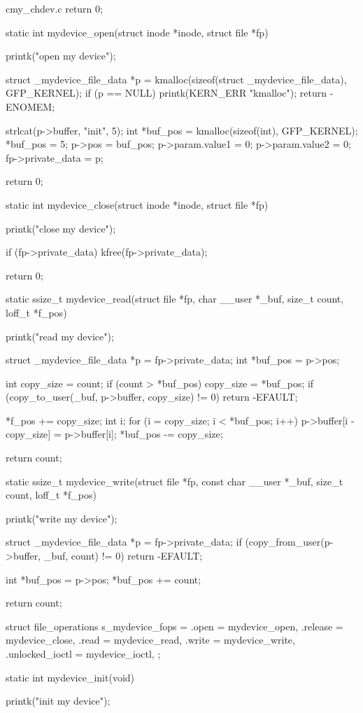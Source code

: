 \begin{longlisting}
\begin{myminted}{c}{my\_chdev.c}
{    return 0;
}

static int mydevice_open(struct inode *inode, struct file *fp) {
    printk("open my device\n");

    struct _mydevice_file_data *p = kmalloc(sizeof(struct _mydevice_file_data), GFP_KERNEL);
    if (p == NULL) {
        printk(KERN_ERR  "kmalloc\n");
        return -ENOMEM;
    }

    strlcat(p->buffer, "init", 5);
    int *buf_pos = kmalloc(sizeof(int), GFP_KERNEL);
    *buf_pos = 5;
    p->pos = buf_pos;
    p->param.value1 = 0;
    p->param.value2 = 0;
    fp->private_data = p;

    return 0;
}

static int mydevice_close(struct inode *inode, struct file *fp) {
    printk("close my device\n");

    if (fp->private_data) {
        kfree(fp->private_data);
    }

    return 0;
}

static ssize_t mydevice_read(struct file *fp, char __user *_buf, size_t count, loff_t *f_pos) {
    printk("read my device\n");

    struct _mydevice_file_data *p = fp->private_data;
    int *buf_pos = p->pos;

    int copy_size = count;
    if (count > *buf_pos) copy_size = *buf_pos;
    if (copy_to_user(_buf, p->buffer, copy_size) != 0) {
        return -EFAULT;
    }

    *f_pos += copy_size;
    int i;
    for (i = copy_size; i < *buf_pos; i++) {
        p->buffer[i - copy_size] = p->buffer[i];
    }
    *buf_pos -= copy_size;

    return count;
}

static ssize_t mydevice_write(struct file *fp, const char __user *_buf, size_t count, loff_t *f_pos) {
    printk("write my device\n");

    struct _mydevice_file_data *p = fp->private_data;
    if (copy_from_user(p->buffer, _buf, count) != 0) {
        return -EFAULT;
    }

    int *buf_pos = p->pos;
    *buf_pos += count;

    return count;
}

struct file_operations s_mydevice_fops = {
    .open    = mydevice_open,
    .release = mydevice_close,
    .read    = mydevice_read,
    .write   = mydevice_write,
    .unlocked_ioctl = mydevice_ioctl,
};

static int mydevice_init(void) {
    printk("init my device\n");

}
\end{myminted}
\end{longlisting}
